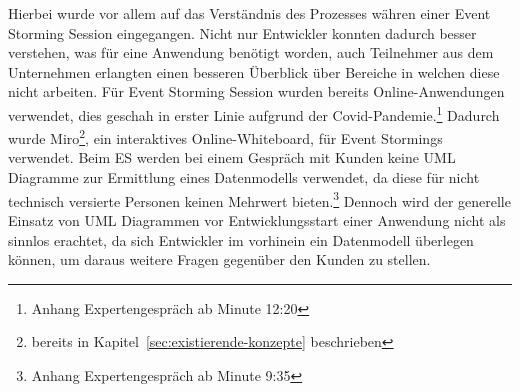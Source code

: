 Hierbei wurde vor allem auf das Verständnis des Prozesses währen einer Event Storming Session eingegangen.
Nicht nur Entwickler konnten dadurch besser verstehen, was für eine Anwendung benötigt worden, auch Teilnehmer aus dem Unternehmen erlangten
einen besseren Überblick über Bereiche in welchen diese nicht arbeiten.\newline
Für Event Storming Session wurden bereits Online-Anwendungen verwendet, dies geschah in erster Linie aufgrund der Covid-Pandemie.\footnote{Anhang Expertengespräch ab Minute 12:20}
Dadurch wurde Miro\footnote{bereits in Kapitel~\ref{sec:existierende-konzepte} beschrieben}, ein interaktives Online-Whiteboard, für Event Stormings verwendet.\newline
Beim \ac{ES} werden bei einem Gespräch mit Kunden keine UML Diagramme zur Ermittlung eines Datenmodells verwendet,
da diese für nicht technisch versierte Personen keinen Mehrwert bieten.\footnote{Anhang Expertengespräch ab Minute 9:35}
Dennoch wird der generelle Einsatz von UML Diagrammen vor Entwicklungsstart einer Anwendung nicht als sinnlos erachtet,
da sich Entwickler im vorhinein ein Datenmodell überlegen können, um daraus weitere Fragen gegenüber den Kunden zu stellen.

